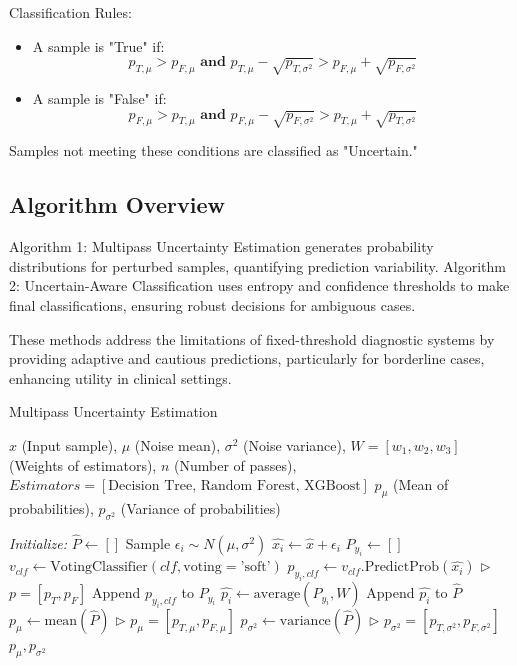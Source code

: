\documentclass{ieeeaccess}
\begin{document}
Classification Rules:
\begin{itemize}
    \item A sample is "True" if:
    \begin{equation}
    p_{T,\mu} > p_{F,\mu} \textbf{ and } p_{T,\mu} - \sqrt{p_{T,\sigma^2}} > p_{F,\mu} + \sqrt{p_{F,\sigma^2}}
    \end{equation}
    \item A sample is "False" if:
    \begin{equation}
    p_{F,\mu} > p_{T,\mu} \textbf{ and } p_{F,\mu} - \sqrt{p_{F,\sigma^2}} > p_{T,\mu} + \sqrt{p_{T,\sigma^2}}
    \end{equation}
\end{itemize}
Samples not meeting these conditions are classified as "Uncertain."

\subsection{Algorithm Overview}
Algorithm 1: Multipass Uncertainty Estimation generates probability distributions for perturbed samples, quantifying prediction variability. Algorithm 2: Uncertain-Aware Classification uses entropy and confidence thresholds to make final classifications, ensuring robust decisions for ambiguous cases.

These methods address the limitations of fixed-threshold diagnostic systems by providing adaptive and cautious predictions, particularly for borderline cases, enhancing utility in clinical settings.


\begin{algorithm}[H]
\caption{Multipass Uncertainty Estimation}
\label{alg:Training}
\begin{algorithmic}[1]
\renewcommand{\algorithmicrequire}{\textbf{Input:}}
\renewcommand{\algorithmicensure}{\textbf{Output:}}
\REQUIRE $\hat{x}$ (Input sample), $\mu$ (Noise mean), $\sigma^2$ (Noise variance), $W=[w_1, w_2, w_3]$ (Weights of estimators), $n$ (Number of passes),
$Estimators=[\text{Decision Tree, Random Forest, XGBoost}]$
\ENSURE $p_{\mu}$ (Mean of probabilities), $p_{\sigma^2}$ (Variance of probabilities)

\STATE \textit{Initialize:} $\hat{P} \gets [ ]$
    \STATE Sample $\epsilon_i \sim N(\mu, \sigma^2)$
    \STATE $\hat{x_i} \gets \hat{x} + \epsilon_i$
    \STATE $P_{y_i} \gets [ ]$
        \STATE $v_{clf} \gets \text{VotingClassifier}(clf, \text{voting} = \text{'soft'})$
        \STATE $p_{y_{i}, clf} \gets v_{clf}.\text{PredictProb}(\hat{x_i})$ \hfill $\triangleright$ $p = [p_T, p_F]$
        \STATE Append $p_{y_{i}, clf}$ to $P_{y_i}$
    \ENDFOR
    \STATE $\hat{p_i} \gets \text{average}(P_{y_i}, W)$
    \STATE Append $\hat{p_i}$ to $\hat{P}$
\ENDFOR
\STATE $p_{\mu} \gets \text{mean}(\hat{P})$ \hfill $\triangleright$ $p_{\mu} = [p_{T,\mu}, p_{F,\mu}]$
\STATE $p_{\sigma^2} \gets \text{variance}(\hat{P})$ \hfill $\triangleright$ $p_{\sigma^2} = [p_{T,\sigma^2}, p_{F,\sigma^2}]$
\RETURN $p_{\mu}, p_{\sigma^2}$
\end{algorithmic}
\end{algorithm}
\end{document}
